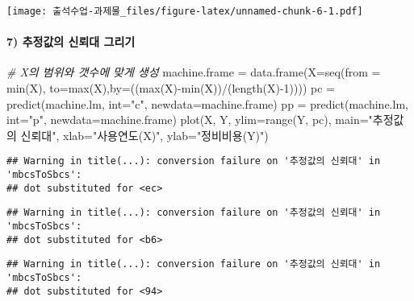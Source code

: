 \documentclass[
]{article}
\newenvironment{Shaded}{\begin{snugshade}}{\end{snugshade}}
\newcommand{\AttributeTok}[1]{\textcolor[rgb]{0.77,0.63,0.00}{#1}}
\newcommand{\CommentTok}[1]{\textcolor[rgb]{0.56,0.35,0.01}{\textit{#1}}}
\newcommand{\DecValTok}[1]{\textcolor[rgb]{0.00,0.00,0.81}{#1}}
\newcommand{\FunctionTok}[1]{\textcolor[rgb]{0.00,0.00,0.00}{#1}}
\newcommand{\NormalTok}[1]{#1}
\newcommand{\OtherTok}[1]{\textcolor[rgb]{0.56,0.35,0.01}{#1}}
\newcommand{\SpecialCharTok}[1]{\textcolor[rgb]{0.00,0.00,0.00}{#1}}
\newcommand{\StringTok}[1]{\textcolor[rgb]{0.31,0.60,0.02}{#1}}
\begin{document}
\texttt{[image: 출석수업-과제물\_files/figure-latex/unnamed-chunk-6-1.pdf]}

\hypertarget{uxcd94uxc815uxac12uxc758-uxc2e0uxb8b0uxb300-uxadf8uxb9acuxae30}{%
\paragraph{7) 추정값의 신뢰대
그리기}\label{uxcd94uxc815uxac12uxc758-uxc2e0uxb8b0uxb300-uxadf8uxb9acuxae30}}

\begin{Shaded}
\begin{Highlighting}[]
\CommentTok{\# X의 범위와 갯수에 맞게 생성}
\NormalTok{machine.frame }\OtherTok{=} \FunctionTok{data.frame}\NormalTok{(}\AttributeTok{X=}\FunctionTok{seq}\NormalTok{(}\AttributeTok{from =} \FunctionTok{min}\NormalTok{(X), }\AttributeTok{to=}\FunctionTok{max}\NormalTok{(X),}\AttributeTok{by=}\NormalTok{((}\FunctionTok{max}\NormalTok{(X)}\SpecialCharTok{{-}}\FunctionTok{min}\NormalTok{(X))}\SpecialCharTok{/}\NormalTok{(}\FunctionTok{length}\NormalTok{(X)}\SpecialCharTok{{-}}\DecValTok{1}\NormalTok{))))}
\NormalTok{pc }\OtherTok{=} \FunctionTok{predict}\NormalTok{(machine.lm, }\AttributeTok{int=}\StringTok{"c"}\NormalTok{, }\AttributeTok{newdata=}\NormalTok{machine.frame)}
\NormalTok{pp }\OtherTok{=} \FunctionTok{predict}\NormalTok{(machine.lm, }\AttributeTok{int=}\StringTok{"p"}\NormalTok{, }\AttributeTok{newdata=}\NormalTok{machine.frame)}
\FunctionTok{plot}\NormalTok{(X, Y, }\AttributeTok{ylim=}\FunctionTok{range}\NormalTok{(Y, pc), }\AttributeTok{main=}\StringTok{"추정값의 신뢰대"}\NormalTok{, }\AttributeTok{xlab=}\StringTok{"사용연도(X)"}\NormalTok{, }\AttributeTok{ylab=}\StringTok{"정비비용(Y)"}\NormalTok{)}
\end{Highlighting}
\end{Shaded}

\begin{verbatim}
## Warning in title(...): conversion failure on '추정값의 신뢰대' in 'mbcsToSbcs':
## dot substituted for <ec>
\end{verbatim}

\begin{verbatim}
## Warning in title(...): conversion failure on '추정값의 신뢰대' in 'mbcsToSbcs':
## dot substituted for <b6>
\end{verbatim}

\begin{verbatim}
## Warning in title(...): conversion failure on '추정값의 신뢰대' in 'mbcsToSbcs':
## dot substituted for <94>
\end{verbatim}
\end{document}
